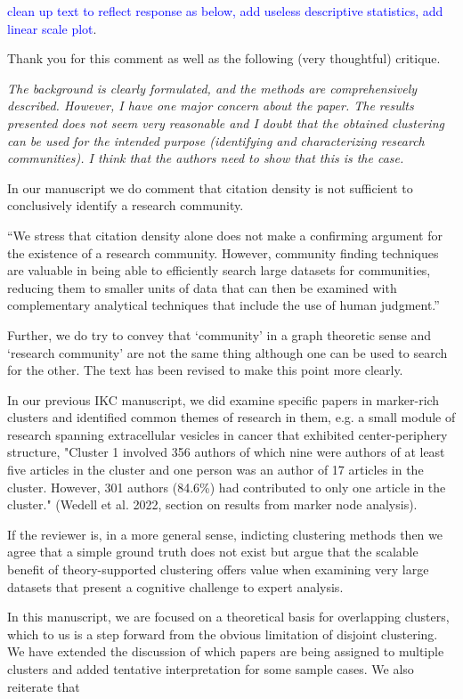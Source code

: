 \documentclass[11pt, oneside]{article}   	%
\begin{document}
\textcolor{blue}{clean up text to reflect response as below, add useless descriptive statistics, add linear scale plot}.

Thank you for this comment as well as the following (very thoughtful) critique.

\emph{The background is clearly formulated, and the methods are comprehensively described. However, I have one major concern about the paper. The results presented does not seem very reasonable and I doubt that the obtained clustering can be used for the intended purpose (identifying and characterizing research communities). I think that the authors need to show that this is the case.}

In our manuscript we do comment that citation density is not sufficient to conclusively identify a research community. 

``We stress that citation density alone does not make a confirming argument for the existence of a research community. However, community finding techniques are valuable in being able to efficiently search large datasets for communities, reducing them to smaller units of data that can then be examined with complementary analytical techniques that include the use of human judgment.''

Further, we do try to convey that `community' in a graph theoretic sense and `research community' are not the same thing although one can be used to search for the other. The text has been revised to make this point more clearly. 

In our previous IKC manuscript, we did examine specific papers in marker-rich clusters and identified common themes of research in them, e.g. a small module of research spanning extracellular vesicles in 
cancer that exhibited center-periphery structure, "Cluster 1 involved 356 authors of which nine were authors of at least five articles in the cluster and one person was an author of 17 articles in the cluster. However, 301 authors (84.6\%) had contributed to only one article in the cluster." (Wedell et al. 2022, section on results from marker node analysis).

If the reviewer is, in a more general sense, indicting clustering methods then we agree that a simple ground truth does not exist but argue that the scalable benefit of theory-supported clustering offers
value when examining very large datasets that present a cognitive challenge to expert analysis.

In this manuscript, we are focused on a theoretical basis for overlapping clusters, which to us is a step forward from the obvious limitation of disjoint clustering. We have extended the discussion of which papers are being assigned to multiple clusters and added tentative interpretation for some sample cases. We also reiterate that 
 
\end{document}
